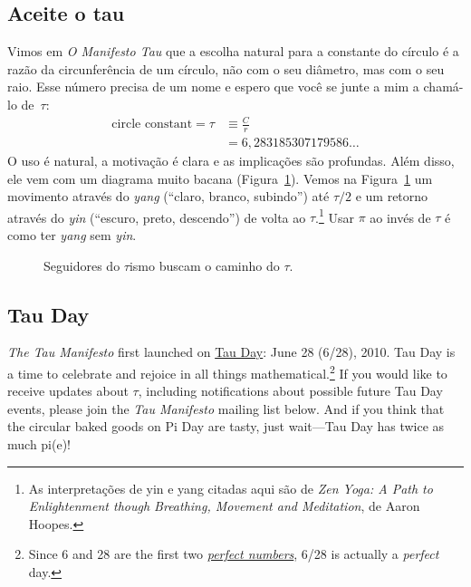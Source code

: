 {  %

  \subsection{Aceite o tau} %
  \label{sec:embrace_the_tau}

Vimos em \emph{O Manifesto  Tau} que a escolha natural para a constante do círculo é a razão da circunferência de um círculo, não com o seu diâmetro, mas com o seu raio. Esse número precisa de um nome e espero que você se junte a mim a chamá-lo de~$\tau$:
\[
\begin{split}
\mbox{circle constant} = \tau & \equiv \frac{C}{r} \\
                              & = 6,283185307179586\ldots
\end{split}
\]
O uso é natural, a motivação é clara e as implicações são profundas. Além disso, ele vem com um diagrama muito bacana (Figura~\ref{fig:tauism}). Vemos na Figura~\ref{fig:tauism} um movimento através do \emph{yang} (``claro, branco, subindo'') até $\tau/2$ e um retorno através do \emph{yin} (``escuro, preto, descendo'') de volta ao $\tau$.\footnote{As interpretações de yin e yang citadas aqui são de \emph{Zen Yoga: A Path to Enlightenment though Breathing, Movement and Meditation}, de Aaron Hoopes.} Usar $\pi$ ao invés de $\tau$ é como ter \emph{yang} sem \emph{yin}.

\begin{figure}
\begin{center}
\end{center}
\caption{Seguidores do $\tau$ismo buscam o caminho do $\tau$.\label{fig:tauism}}
\end{figure}



  \subsection{Tau Day} %
  \label{sec:tau_day}

\emph{The Tau Manifesto} first launched on \href{https://tauday.com/}{Tau Day}: June 28 (6/28), 2010. Tau Day is a time to celebrate and rejoice in all things mathematical.\footnote{Since 6 and 28 are the first two \href{https://en.wikipedia.org/wiki/Perfect_number}{\emph{perfect numbers}}, 6/28 is actually a \emph{perfect} day.} If you would like to receive updates about $\tau$, including notifications about possible future Tau Day events, please join the \emph{Tau Manifesto} mailing list below. And if you think that the circular baked goods on Pi Day are tasty, just wait---Tau Day has twice as much pi(e)!

}
